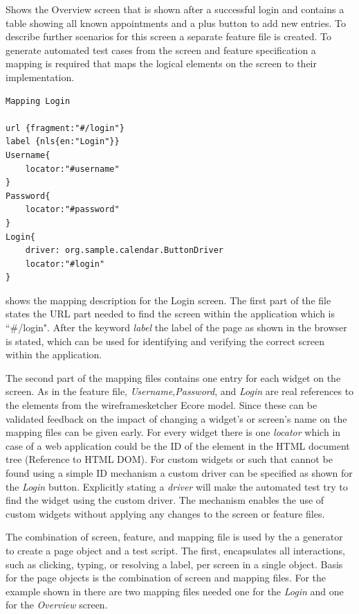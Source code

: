 \documentclass{sig-alternate-05-2015}
\begin{document}
 Shows the Overview screen that is shown after a successful login and contains a table showing all known appointments and a plus button to add new entries.
To describe further scenarios for this screen a separate feature file is created.
To generate automated test cases from the screen and feature specification a mapping is required that maps the logical elements on the screen to their implementation.

\begin{lstlisting}[captionpos=b, caption=Mapping Description: Login Screen., label={lst:mappinglogin}, language=dsl]
Mapping Login

url {fragment:"#/login"}
label {nls{en:"Login"}}
Username{
	locator:"#username"
}
Password{
	locator:"#password"
}
Login{ 
    driver: org.sample.calendar.ButtonDriver
    locator:"#login"
}
\end{lstlisting}

 shows the mapping description for the Login screen.
The first part of the file states the URL part needed to find the screen within the application which is ``\#/login". 
After the keyword \textit{label} the label of the page as shown in the browser is stated, which can be used for identifying and verifying the correct screen within the application.

The second part of the mapping files contains one entry for each widget on the screen.
As in the feature file, \textit{Username},\textit{Password}, and \textit{Login} are real references to the elements from the wireframesketcher Ecore model.
Since these can be validated feedback on the impact of changing a widget's or screen's name on the mapping files can be given early.
For every widget there is one \textit{locator} which in case of a web application could be the ID of the element in the HTML document tree (Reference to HTML DOM).
For custom widgets or such that cannot be found using a simple ID mechanism a custom driver can be specified as shown for the \textit{Login} button.
Explicitly stating a \textit{driver} will make the automated test try to find the widget using the custom driver. 
The mechanism enables the use of custom widgets without applying any changes to the screen or feature files.

The combination of screen, feature, and mapping file is used by the a generator to create a page object and a test script.
The first, encapsulates all interactions, such as clicking, typing, or resolving a label, per screen in a single object.
Basis for the page objects is the combination of screen and mapping files.
For the example shown in  there are two mapping files needed one for the \textit{Login} and one for the \textit{Overview} screen.
\end{document}
